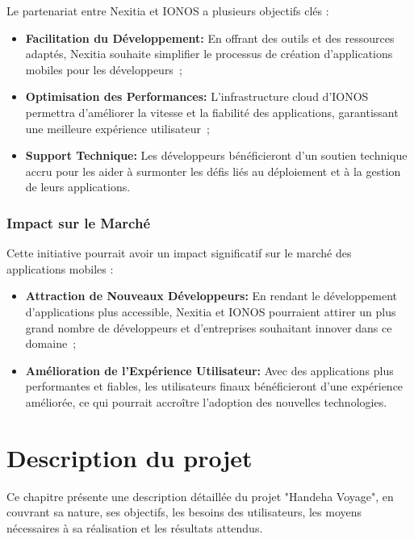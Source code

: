 \documentclass[12pt]{report}
\begin{document}
				Le partenariat entre Nexitia et IONOS a plusieurs objectifs clés :

				\begin{itemize}
					\item \textbf{Facilitation du Développement:} En offrant des outils et des ressources adaptés, Nexitia souhaite simplifier le processus de création d'applications mobiles pour les développeurs ;
					\item \textbf{Optimisation des Performances:} L'infrastructure cloud d'IONOS permettra d'améliorer la vitesse et la fiabilité des applications, garantissant une meilleure expérience utilisateur ;
					\item \textbf{Support Technique:} Les développeurs bénéficieront d'un soutien technique accru pour les aider à surmonter les défis liés au déploiement et à la gestion de leurs applications.
				\end{itemize}

				 \subsection{Impact sur le Marché}

				Cette initiative pourrait avoir un impact significatif sur le marché des applications mobiles :

				\begin{itemize}
					\item \textbf{Attraction de Nouveaux Développeurs:} En rendant le développement d'applications plus accessible, Nexitia et IONOS pourraient attirer un plus grand nombre de développeurs et d'entreprises souhaitant innover dans ce domaine ;
					\item \textbf{Amélioration de l'Expérience Utilisateur:} Avec des applications plus performantes et fiables, les utilisateurs finaux bénéficieront d'une expérience améliorée, ce qui pourrait accroître l'adoption des nouvelles technologies.
				\end{itemize}





				\chapter{Description du projet}

				\hspace{15pt} Ce chapitre présente une description détaillée du projet "Handeha Voyage", en couvrant sa nature, ses objectifs, les besoins des utilisateurs, les moyens nécessaires à sa réalisation et les résultats attendus.
\end{document}
